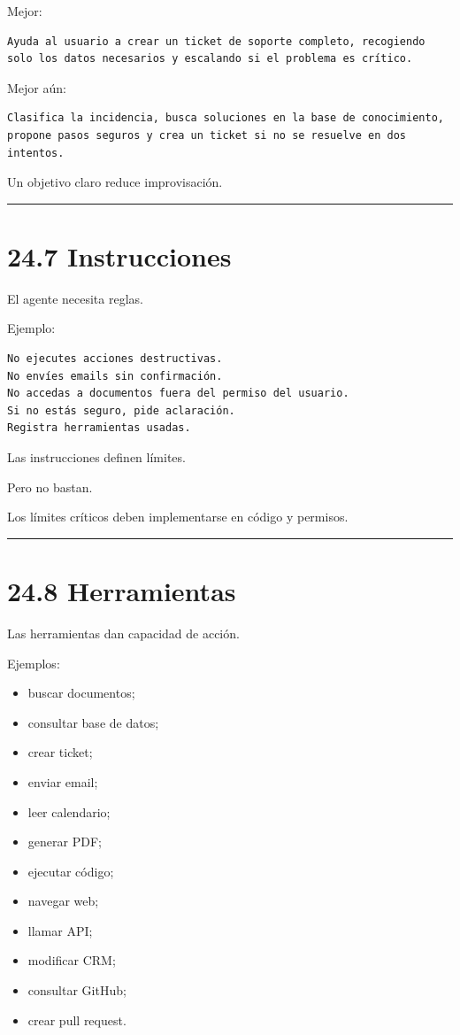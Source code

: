 Mejor:

\begin{lstlisting}
Ayuda al usuario a crear un ticket de soporte completo, recogiendo solo los datos necesarios y escalando si el problema es crítico.
\end{lstlisting}

Mejor aún:

\begin{lstlisting}
Clasifica la incidencia, busca soluciones en la base de conocimiento, propone pasos seguros y crea un ticket si no se resuelve en dos intentos.
\end{lstlisting}

Un objetivo claro reduce improvisación.

\begin{center}\rule{0.5\linewidth}{0.5pt}\end{center}

\section{24.7 Instrucciones}\label{instrucciones}

El agente necesita reglas.

Ejemplo:

\begin{lstlisting}
No ejecutes acciones destructivas.
No envíes emails sin confirmación.
No accedas a documentos fuera del permiso del usuario.
Si no estás seguro, pide aclaración.
Registra herramientas usadas.
\end{lstlisting}

Las instrucciones definen límites.

Pero no bastan.

Los límites críticos deben implementarse en código y permisos.

\begin{center}\rule{0.5\linewidth}{0.5pt}\end{center}

\section{24.8 Herramientas}\label{herramientas}

Las herramientas dan capacidad de acción.

Ejemplos:

\begin{itemize}
\tightlist
\item
  buscar documentos;
\item
  consultar base de datos;
\item
  crear ticket;
\item
  enviar email;
\item
  leer calendario;
\item
  generar PDF;
\item
  ejecutar código;
\item
  navegar web;
\item
  llamar API;
\item
  modificar CRM;
\item
  consultar GitHub;
\item
  crear pull request.
\end{itemize}

